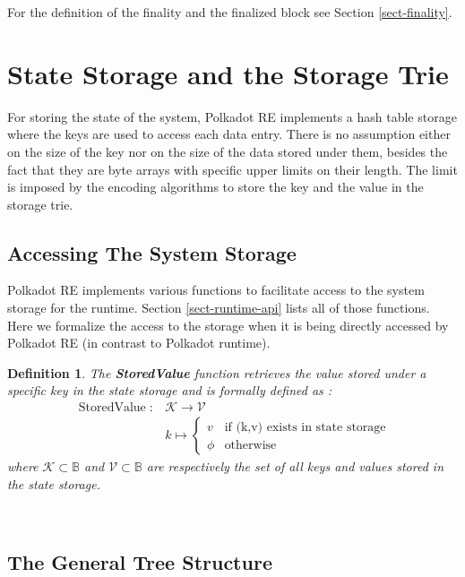 \documentclass{article}
\newcommand{\tmop}[1]{\ensuremath{\operatorname{#1}}}
\newcommand{\tmstrong}[1]{\textbf{#1}}
\newcommand{\tmtextbf}[1]{{\bfseries{#1}}}
\newtheorem{definition}{Definition}
\providecommand{\tmop}[1]{\ensuremath{\mathrm{#1}}}
\providecommand{\tmstrong}[1]{\tmtextbf{#1}}
\providecommand{\tmtextbf}[1]{\tmtextbf{#1}}
\newtheorem{definition}{Definition}
\begin{document}
\hrulefill{\medskip}

For the definition of the finality and the finalized block see Section
\ref{sect-finality}.

\section{State Storage and the Storage Trie}

For storing the state of the system, Polkadot RE implements a hash table
storage where the keys are used to access each data entry. There is no
assumption either on the size of the key nor on the size of the data stored
under them, besides the fact that they are byte arrays with specific upper
limits on their length. The limit is imposed by the encoding algorithms to
store the key and the value in the storage trie.

\subsection{Accessing The System Storage }

Polkadot RE implements various functions to facilitate access to the system
storage for the runtime. Section \ref{sect-runtime-api} lists all of those
functions. Here we formalize the access to the storage when it is being
directly accessed by Polkadot RE (in contrast to Polkadot runtime).

\begin{definition}
  \label{defn-stored-value}The {\tmstrong{StoredValue}} function retrieves the
  value stored under a specific key in the state storage and is formally
  defined as :
  \[ \begin{array}{cc}
       \tmop{StoredValue} : & \mathcal{K} \rightarrow \mathcal{V}\\
       & k \mapsto \left\{ \begin{array}{cc}
         v & \text{if (k,v) exists in state storage}\\
         \phi & \tmop{otherwise}
       \end{array} \right.
     \end{array} \]
  where $\mathcal{K} \subset \mathbb{B}$ and $\mathcal{V} \subset \mathbb{B}$
  are respectively the set of all keys and values stored in the state storage.
  
  \ 
\end{definition}

\subsection{The General Tree Structure}
\end{document}
